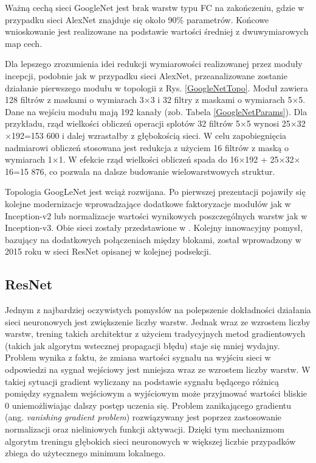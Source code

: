 Ważną cechą sieci GoogleNet jest brak warstw typu FC na zakończeniu, gdzie w przypadku sieci AlexNet znajduje się około 90\% parametrów. Końcowe wnioskowanie jest realizowane na podstawie wartości średniej z dwuwymiarowych map cech.

Dla lepszego zrozumienia idei redukcji wymiarowości realizowanej przez moduły incepcji, podobnie jak w przypadku sieci AlexNet, przeanalizowane zostanie działanie pierwszego modułu w topologii z Rys. \ref{GoogleNetTopo}.
Moduł zawiera 128 filtrów z maskami o wymiarach 3$\times$3 i 32 filtry z maskami o wymiarach 5$\times$5. Dane na wejściu modułu mają 192 kanały (zob. Tabela \ref{GoogleNetParams}). Dla przykładu, rząd wielkości obliczeń operacji splotów 32 filtrów 5$\times$5 wynosi 25$\times$32$\times$192=153 600 i dalej wzrastałby z głębokością sieci. W celu zapobiegnięcia nadmiarowi obliczeń stosowana jest redukcja z użyciem 16 filtrów z maską o wymiarach 1$\times$1. W efekcie rząd wielkości obliczeń spada do 16$\times$192 +  25$\times$32$\times$16=15 876, co pozwala na dalsze budowanie wielowarstwowych struktur.

Topologia GoogLeNet jest wciąż rozwijana. Po pierwszej prezentacji pojawiły się kolejne modernizacje wprowadzające dodatkowe faktoryzacje modułów jak w Inception-v2 lub normalizacje wartości wynikowych poszczególnych warstw jak w Inception-v3. Obie sieci zostały przedstawione w \cite{DBLP:journals/corr/SzegedyVISW15}. Kolejny innowacyjny pomysł, bazujący na dodatkowych połączeniach między blokami, został wprowadzony w 2015 roku w sieci ResNet opisanej w kolejnej podsekcji.

\subsection{ResNet}
\label{resnet}
Jednym z najbardziej oczywistych pomysłów na polepszenie dokładności działania sieci neuronowych jest zwiększenie liczby warstw. Jednak wraz ze wzrostem liczby warstw, trening takich architektur z użyciem tradycyjnych metod gradientowych (takich jak algorytm wstecznej propagacji błędu) staje się mniej wydajny. Problem wynika z faktu, że zmiana wartości sygnału na wyjściu sieci w odpowiedzi na sygnał wejściowy jest mniejsza wraz ze wzrostem liczby warstw. W takiej sytuacji gradient wyliczany na podstawie sygnału będącego różnicą pomiędzy sygnałem wejściowym a wyjściowym może przyjmować wartości bliskie 0 uniemożliwiając dalszy postęp uczenia się. Problem zanikającego gradientu (ang. \textit{vanishing gradient problem}) rozwiązywany jest poprzez zastosowanie normalizacji oraz nieliniowych funkcji aktywacji. Dzięki tym mechanizmom algorytm treningu głębokich sieci neuronowych w większej liczbie przypadków zbiega do użytecznego minimum lokalnego. 

